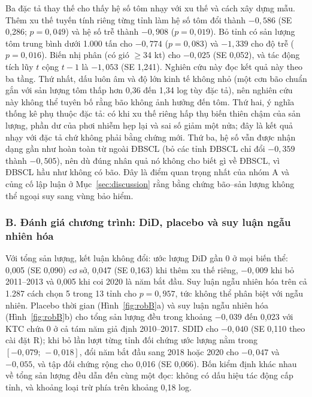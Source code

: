 \documentclass[12pt,a4paper]{article}
\begin{document}
Ba đặc tả thay thế cho thấy hệ số tôm nhạy với xu thế và cách xây dựng mẫu. Thêm xu thế tuyến tính riêng từng tỉnh làm hệ số tôm đổi thành $-0{,}586$ (SE 0,286; $p=0{,}049$) và hệ số trễ thành $-0{,}908$ ($p=0{,}019$). Bỏ tỉnh có sản lượng tôm trung bình dưới 1.000 tấn cho $-0{,}774$ ($p=0{,}083$) và $-1{,}339$ cho độ trễ ($p=0{,}016$). Biến nhị phân (có gió $\geq$34 kt) cho $-0{,}025$ (SE 0,052), và tác động tích lũy $t$ cộng $t-1$ là $-1{,}053$ (SE 1,241). Nghiên cứu này đọc kết quả này theo ba tầng. Thứ nhất, dấu luôn âm và độ lớn kinh tế không nhỏ (một cơn bão chuẩn gắn với sản lượng tôm thấp hơn 0,36 đến 1,34 log tùy đặc tả), nên nghiên cứu này không thể tuyên bố rằng bão không ảnh hưởng đến tôm. Thứ hai, ý nghĩa thống kê phụ thuộc đặc tả: có khi xu thế riêng hấp thụ biến thiên chậm của sản lượng, phần dư của phơi nhiễm hẹp lại và sai số giảm một nửa; đây là kết quả nhạy với đặc tả chứ không phải bằng chứng mới. Thứ ba, hệ số vẫn được nhận dạng gần như hoàn toàn từ ngoài ĐBSCL (bỏ các tỉnh ĐBSCL chỉ đổi $-0{,}359$ thành $-0{,}505$), nên dù đúng nhân quả nó không cho biết gì về ĐBSCL, vì ĐBSCL hầu như không có bão. Đây là điểm quan trọng nhất của nhóm A và củng cố lập luận ở Mục~\ref{sec:discussion} rằng bằng chứng bão--sản lượng không thể ngoại suy sang vùng bảo hiểm.

\subsubsection*{B. Đánh giá chương trình: DiD, placebo và suy luận ngẫu nhiên hóa}

Với tổng sản lượng, kết luận không đổi: ước lượng DiD gần 0 ở mọi biến thể: 0,005 (SE 0,090) cơ sở, 0,047 (SE 0,163) khi thêm xu thế riêng, $-0{,}009$ khi bỏ 2011--2013 và 0,005 khi coi 2020 là năm bắt đầu. Suy luận ngẫu nhiên hóa trên cả 1.287 cách chọn 5 trong 13 tỉnh cho $p=0{,}957$, tức không thể phân biệt với ngẫu nhiên. Placebo thời gian (Hình~\ref{fig:robB}a) và suy luận ngẫu nhiên hóa (Hình~\ref{fig:robB}b) cho tổng sản lượng đều trong khoảng $-0{,}039$ đến 0,023 với KTC chứa 0 ở cả tám năm giả định 2010--2017. SDID cho $-0{,}040$ (SE 0,110 theo cài đặt R); khi bỏ lần lượt từng tỉnh đối chứng ước lượng nằm trong $[-0{,}079;\,-0{,}018]$, đổi năm bắt đầu sang 2018 hoặc 2020 cho $-0{,}047$ và $-0{,}055$, và tập đối chứng rộng cho 0,016 (SE 0,066). Bốn kiểm định khác nhau về tổng sản lượng đều dẫn đến cùng một đọc: không có dấu hiệu tác động cấp tỉnh, và khoảng loại trừ phía trên khoảng 0,18 log.
\end{document}
